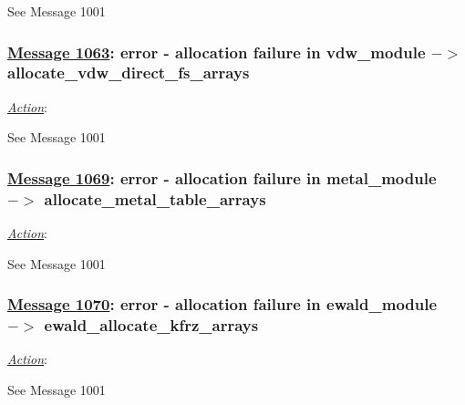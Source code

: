 See Message 1001

\subsubsection*{\underline{Message 1063}: error - allocation failure in vdw\_module $->$ allocate\_vdw\_direct\_fs\_arrays}

\noindent \underline{\em Action}:

See Message 1001

\subsubsection*{\underline{Message 1069}: error - allocation failure in metal\_module $->$ allocate\_metal\_table\_arrays}

\noindent \underline{\em Action}:

See Message 1001

\subsubsection*{\underline{Message 1070}: error - allocation failure in ewald\_module $->$ ewald\_allocate\_kfrz\_arrays}

\noindent \underline{\em Action}:

See Message 1001
